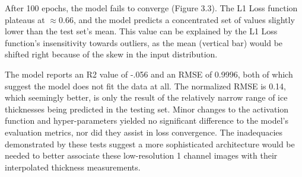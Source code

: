 After 100 epochs, the model fails to converge (Figure 3.3). The L1 Loss function plateaus at $\approx0.66$, and the model predicts a concentrated set of values slightly lower than the test set's mean. This value can be explained by the L1 Loss function's insensitivity towards outliers, as the mean (vertical bar) would be shifted right because of the skew in the input distribution.

The model reports an R2 value of -.056 and an RMSE of 0.9996, both of which suggest the model does not fit the data at all. The normalized RMSE is 0.14, which seemingly better, is only the result of the relatively narrow range of ice thicknesses being predicted in the testing set. Minor changes to the activation function and hyper-parameters yielded no significant difference to the model's evaluation metrics, nor did they assist in loss convergence. The inadequacies demonstrated by these tests suggest a more sophisticated architecture would be needed to better associate these low-resolution 1 channel images with their interpolated thickness measurements.

